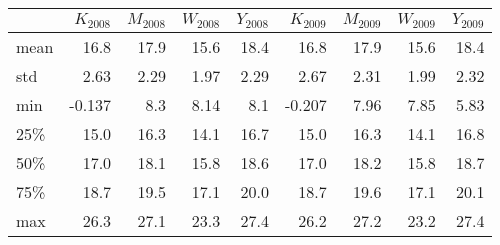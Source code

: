 \begin{tabular}{lrrrrrrrr}
\toprule
{} &   $K_{2008}$ &  $M_{2008}$ &  $W_{2008}$ &  $Y_{2008}$ &   $K_{2009}$ &  $M_{2009}$ &  $W_{2009}$ &  $Y_{2009}$ \\
\midrule
mean &   16.8 &  17.9 &  15.6 &  18.4 &   16.8 &  17.9 &  15.6 &  18.4 \\
std  &   2.63 &  2.29 &  1.97 &  2.29 &   2.67 &  2.31 &  1.99 &  2.32 \\
min  & -0.137 &   8.3 &  8.14 &   8.1 & -0.207 &  7.96 &  7.85 &  5.83 \\
25\%  &   15.0 &  16.3 &  14.1 &  16.7 &   15.0 &  16.3 &  14.1 &  16.8 \\
50\%  &   17.0 &  18.1 &  15.8 &  18.6 &   17.0 &  18.2 &  15.8 &  18.7 \\
75\%  &   18.7 &  19.5 &  17.1 &  20.0 &   18.7 &  19.6 &  17.1 &  20.1 \\
max  &   26.3 &  27.1 &  23.3 &  27.4 &   26.2 &  27.2 &  23.2 &  27.4 \\
\bottomrule
\end{tabular}